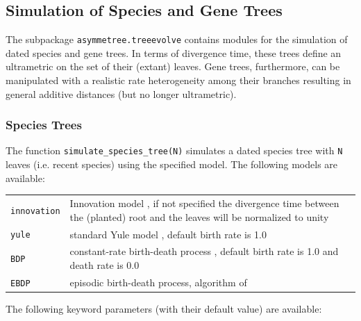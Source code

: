 \documentclass[hidelinks,11pt]{article}
\newcommand{\sq}{\textquotesingle}
\begin{document}
\subsection{Simulation of Species and Gene Trees}

The subpackage \texttt{asymmetree.treeevolve} contains modules for the simulation of dated species and gene trees.
In terms of divergence time, these trees define an ultrametric on the set of their (extant) leaves.
Gene trees, furthermore, can be manipulated with a realistic rate heterogeneity 
among their branches resulting in general additive distances (but no longer 
ultrametric).


\subsubsection{Species Trees}

The function \texttt{simulate\_species\_tree(N)} simulates a dated species tree with \texttt{N} leaves (i.e. recent species) using the specified model.
The following models are available:

\vspace{3mm}
{\small\centering
	\begin{longtable}{ p{3.5cm} p{10cm} }
		\texttt{\sq innovation\sq} & Innovation model \citet{keller-schmidt2012},
		if not specified the divergence time between the (planted) root and the
		leaves will be normalized to unity\\
		\texttt{\sq yule\sq}  & standard Yule model \citep{yule1924}, default birth
		rate is 1.0 \\
		\texttt{\sq BDP\sq} & constant-rate birth-death process \citep[see
		e.g.][]{kendall1948,hagen2018}, default birth rate is 1.0 and death rate is
		0.0 \\
		\texttt{\sq EBDP\sq} & episodic birth-death process, algorithm of
		\cite{stadler2011} \\
	\end{longtable}
}
\vspace{3mm}

\noindent
The following keyword parameters (with their default value) are available:
\end{document}
